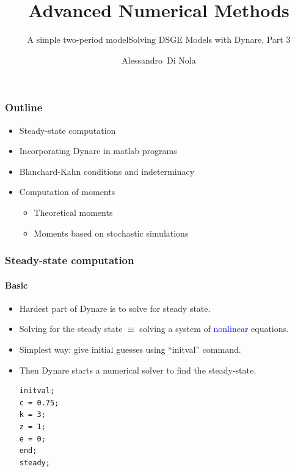 \documentclass{beamer}
\subtitle{A simple two-period model}
\institute[Universities Here and There]{University of Birmingham}
\begin{document}
\title{Advanced Numerical Methods}
\subtitle{Solving DSGE Models with Dynare, Part 3}
\author{Alessandro~Di Nola}
\date{}

\begin{frame}
\titlepage
\end{frame}


\begin{frame}%
\frametitle{Outline}

\begin{itemize}
\item Steady-state computation
\medskip
\item Incorporating Dynare in matlab programs
\medskip
\item Blanchard-Kahn conditions and indeterminacy
\medskip

\item Computation of moments

\begin{itemize}
\item Theoretical moments

\item Moments based on stochastic simulations
\end{itemize}


\end{itemize}

\end{frame}

\begin{frame}[fragile]
\frametitle{Steady-state computation}
\framesubtitle{Basic}
\begin{itemize}
\item Hardest part of Dynare is to solve for steady state.
\item Solving for the steady state $ \equiv $ solving a system of \textcolor{blue}{nonlinear} equations.
\pause 
\item Simplest way: give initial guesses using ``initval'' command.
\item Then Dynare starts a numerical solver to find the steady-state. 
\begin{verbatim}
initval;
c = 0.75;
k = 3;
z = 1;
e = 0;
end;
steady;
\end{verbatim}

\end{itemize}

\end{frame}
\end{document}
